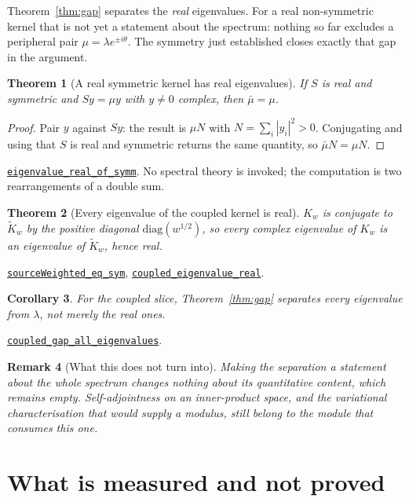 \documentclass[11pt]{article}
\newtheorem{theorem}{Theorem}[section]
\newtheorem{corollary}[theorem]{Corollary}
\newtheorem{remark}[theorem]{Remark}
\theoremstyle{definition}
\newcommand{\anchor}{ac8979631c1541b059b3c10f590ca174b0b5f6be}
\newcommand{\osline}[3]{%
  \href{https://github.com/lluiseriksson/THE-ERIKSSON-PROGRAMME/blob/\anchor/YangMills/OS/#1.lean\#L#2}{\nolinkurl{#3}}}
\begin{document}
Theorem~\ref{thm:gap} separates the \emph{real} eigenvalues.  For a real
non-symmetric kernel that is not yet a statement about the spectrum: nothing so
far excludes a peripheral pair $\mu=\lambda e^{\pm i\theta}$.  The symmetry just
established closes exactly that gap in the argument.

\begin{theorem}[A real symmetric kernel has real eigenvalues]\label{thm:symreal}
If $S$ is real and symmetric and $Sy=\mu y$ with $y\neq0$ complex, then
$\bar\mu=\mu$.
\end{theorem}

\begin{proof}
Pair $y$ against $Sy$: the result is $\mu N$ with $N=\sum_i|y_i|^2>0$.
Conjugating and using that $S$ is real and symmetric returns the same quantity,
so $\bar\mu N=\mu N$.
\end{proof}

\osline{PerronGap}{349}{eigenvalue\_real\_of\_symm}.  No spectral theory
is invoked; the computation is two rearrangements of a double sum.

\begin{theorem}[Every eigenvalue of the coupled kernel is real]\label{thm:allreal}
$K_w$ is conjugate to $\widetilde K_w$ by the positive diagonal
$\mathrm{diag}(w^{1/2})$, so every complex eigenvalue of $K_w$ is an eigenvalue
of $\widetilde K_w$, hence real.
\end{theorem}

\osline{PerronGap}{428}{sourceWeighted\_eq\_sym},
\osline{PerronGap}{443}{coupled\_eigenvalue\_real}.

\begin{corollary}\label{cor:whole}
For the coupled slice, Theorem~\ref{thm:gap} separates \emph{every} eigenvalue
from $\lambda$, not merely the real ones.
\end{corollary}

\osline{PerronGap}{483}{coupled\_gap\_all\_eigenvalues}.

\begin{remark}[What this does not turn into]
Making the separation a statement about the whole spectrum changes nothing about
its \emph{quantitative} content, which remains empty.  Self-adjointness on an
inner-product space, and the variational characterisation that would supply a
modulus, still belong to the module that consumes this one.
\end{remark}

\section{What is measured and not proved}\label{sec:measured}
\end{document}
